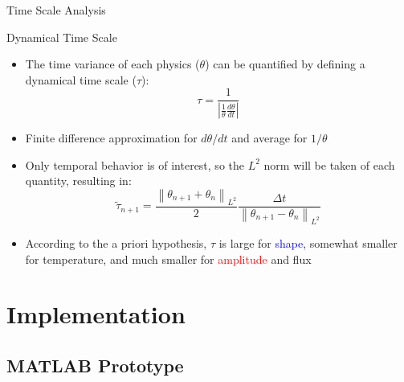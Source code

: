 \documentclass[8pt,xcolor=dvipnames]{beamer}
\newcommand{\be}{\begin{equation*}}
\newcommand{\ee}{\end{equation*}}
\newcommand{\norm}[1]{\left\lVert#1\right\rVert_{L^2}}
\newcommand{\tcr}[1]{\textcolor{red}{#1}}
\newcommand{\tcb}[1]{\textcolor{blue}{#1}}
\begin{document}
\begin{frame}{Time Scale Analysis}

\begin{block}{Dynamical Time Scale}
\begin{itemize}
\item The time variance of each physics ($\theta$) can be quantified by defining a dynamical time scale ($\tau$):
\be
\tau = \frac{1}{\left|\frac{1}{\theta}\frac{d\theta}{dt}\right|}
\ee
\item Finite difference approximation for $d\theta/dt$ and average for $1/\theta$
\item Only temporal behavior is of interest, so the $L^2$ norm will be taken of each quantity, resulting in:
\be
\tilde{\tau}_{n+1} = \frac{\norm{\theta_{n+1} + \theta_{n}}}{2}\frac{\Delta t}{\norm{\theta_{n+1} - \theta_{n}}}
\ee
\item According to the a priori hypothesis, $\tau$ is large for \tcb{shape}, somewhat smaller for temperature, and much smaller for \tcr{amplitude} and flux
\end{itemize}
\end{block}

\end{frame}

\section{Implementation}

\subsection{MATLAB Prototype}
\end{document}
